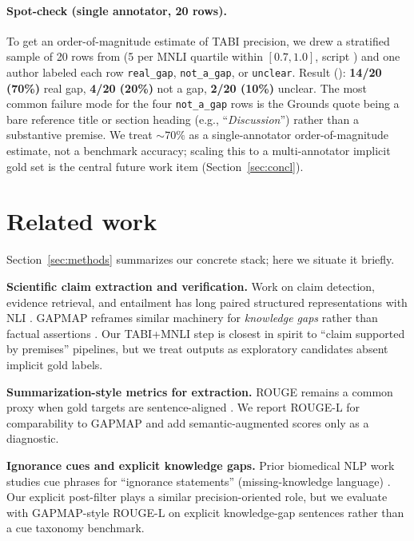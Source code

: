 \documentclass{article}
\begin{document}
\paragraph{Spot-check (single annotator, 20 rows).} To get an order-of-magnitude estimate of TABI precision, we drew a stratified sample of 20 rows from  (5 per MNLI quartile within $[0.7, 1.0]$, script ) and one author labeled each row \texttt{real\_gap}, \texttt{not\_a\_gap}, or \texttt{unclear}. Result (): \textbf{14/20 (70\%)} real gap, \textbf{4/20 (20\%)} not a gap, \textbf{2/20 (10\%)} unclear. The most common failure mode for the four \texttt{not\_a\_gap} rows is the Grounds quote being a bare reference title or section heading (e.g., ``\emph{Discussion}'') rather than a substantive premise. We treat $\sim 70\%$ as a single-annotator order-of-magnitude estimate, not a benchmark accuracy; scaling this to a multi-annotator implicit gold set is the central future work item (Section~\ref{sec:concl}).

\section{Related work}
\noindent Section~\ref{sec:methods} summarizes our concrete stack; here we situate it briefly.

\textbf{Scientific claim extraction and verification.} Work on claim detection, evidence retrieval, and entailment has long paired structured representations with NLI \citep{thorne2018fever}. GAPMAP reframes similar machinery for \emph{knowledge gaps} rather than factual assertions \citep{salem2025gapmap}. Our TABI+MNLI step is closest in spirit to ``claim supported by premises'' pipelines, but we treat outputs as exploratory candidates absent implicit gold labels.

\textbf{Summarization-style metrics for extraction.} ROUGE remains a common proxy when gold targets are sentence-aligned \citep{lin2004rouge,rougescore}. We report ROUGE-L for comparability to GAPMAP and add semantic-augmented scores only as a diagnostic.

\textbf{Ignorance cues and explicit knowledge gaps.} Prior biomedical NLP work studies cue phrases for ``ignorance statements'' (missing-knowledge language) \citep{boguslav2023ignorance}. Our explicit post-filter plays a similar precision-oriented role, but we evaluate with GAPMAP-style ROUGE-L on explicit knowledge-gap sentences rather than a cue taxonomy benchmark.
\end{document}
